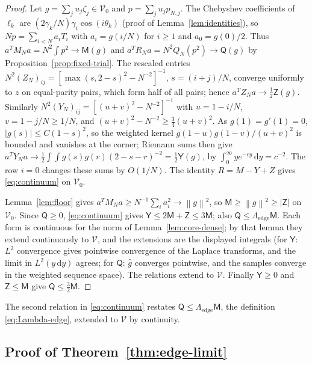 \documentclass{siamart251216}
\newcommand{\norm}[1]{\left\lVert#1\right\rVert}
\newcommand{\dd}{\,\mathrm d}
\begin{document}
\begin{proof}
Let $g=\sum_ju_j\zeta_j\in\mathcal V_0$ and $p=\sum_ju_jp_{N,j}$. The
Chebyshev coefficients of $\ell_k$ are $(2\gamma_k/N)\gamma_i\cos(i\theta_k)$
(proof of Lemma~\ref{lem:identities}), so $Np=\sum_{i<N}a_iT_i$ with
$a_i=g(i/N)$ for $i\ge1$ and $a_0=g(0)/2$. Thus
$a^TM_Na=N^2\int p^2\to\mathsf M(g)$ and $a^TR_Na=N^2Q_N(p^2)\to\mathsf Q(g)$
by Proposition~\ref{prop:fixed-trial}. The rescaled entries
$N^2(Z_N)_{ij}=[\max(s,2-s)^2-N^{-2}]^{-1}$, $s=(i+j)/N$, converge uniformly
to $z$ on equal-parity pairs, which form half of all pairs; hence
$a^TZ_Na\to\frac12\mathsf Z(g)$. Similarly
$N^2(Y_N)_{ij}=[(u+v)^2-N^{-2}]^{-1}$ with $u=1-i/N$, $v=1-j/N\ge1/N$,
and $(u+v)^2-N^{-2}\ge\frac34(u+v)^2$. As $g(1)=g'(1)=0$, $|g(s)|\le C(1-s)^2$,
so the weighted kernel $g(1-u)g(1-v)/(u+v)^2$ is bounded and vanishes at the
corner; Riemann sums then give
$a^TY_Na\to\frac12\int\!\!\int g(s)g(r)(2-s-r)^{-2}=\frac12\mathsf Y(g)$, by
$\int_0^\infty ye^{-cy}\dd y=c^{-2}$. The row $i=0$ changes these sums by
$O(1/N)$. The identity $R=M-Y+Z$ gives \eqref{eq:continuum} on
$\mathcal V_0$.

Lemma~\ref{lem:floor} gives $a^TM_Na\ge N^{-1}\sum_ia_i^2\to\norm g^2$, so
$\mathsf M\ge\norm g^2\ge|\mathsf Z|$ on $\mathcal V_0$. Since
$\mathsf Q\ge0$, \eqref{eq:continuum} gives $\mathsf Y\le2\mathsf M+\mathsf Z
\le3\mathsf M$; also $\mathsf Q\le\Lambda_{\mathrm{edge}}\mathsf M$. Each form
is continuous for the norm of Lemma~\ref{lem:core-dense}; by that lemma they
extend continuously to $\mathcal V$, and the extensions are the displayed
integrals (for $\mathsf Y$: $L^2$ convergence gives pointwise convergence of
the Laplace transforms, and the limit in $L^2(y\dd y)$ agrees; for $\mathsf Q$:
$\widehat g$ converges pointwise, and the samples converge in the weighted
sequence space). The relations extend to $\mathcal V$. Finally
$\mathsf Y\ge0$ and $\mathsf Z\le\mathsf M$ give $\mathsf Q\le\frac32\mathsf M$.
\end{proof}

The second relation in \eqref{eq:continuum} restates
$\mathsf Q\le\Lambda_{\mathrm{edge}}\mathsf M$, the definition
\eqref{eq:Lambda-edge}, extended to $\mathcal V$ by continuity.

\subsection{\texorpdfstring{Proof of Theorem~\ref{thm:edge-limit}}{Proof of the endpoint limit theorem}}\label{app:edge-limit}
\end{document}
